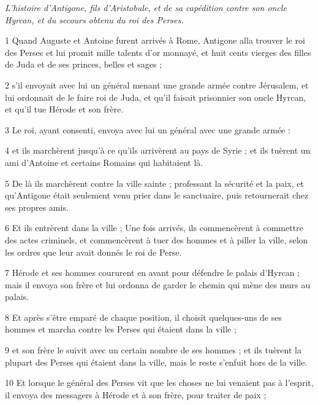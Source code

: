 
\par \textit{L'histoire d'Antigone, fils d'Aristobule, et de sa capédition contre son oncle Hyrcan, et du secours obtenu du roi des Perses.}

\par 1 Quand Auguste et Antoine furent arrivés à Rome, Antigone alla trouver le roi des Perses et lui promit mille talents d'or monnayé, et huit cents vierges des filles de Juda et de ses princes, belles et sages ;

\par 2 s'il envoyait avec lui un général menant une grande armée contre Jérusalem, et lui ordonnait de le faire roi de Juda, et qu'il faisait prisonnier son oncle Hyrcan, et qu'il tue Hérode et son frère.

\par 3 Le roi, ayant consenti, envoya avec lui un général avec une grande armée :

\par 4 et ils marchèrent jusqu'à ce qu'ils arrivèrent au pays de Syrie ; et ils tuèrent un ami d'Antoine et certains Romains qui habitaient là.

\par 5 De là ils marchèrent contre la ville sainte ; professant la sécurité et la paix, et qu'Antigone était seulement venu prier dans le sanctuaire, puis retournerait chez ses propres amis.

\par 6 Et ils entrèrent dans la ville ; Une fois arrivés, ils commencèrent à commettre des actes criminels, et commencèrent à tuer des hommes et à piller la ville, selon les ordres que leur avait donnés le roi de Perse.

\par 7 Hérode et ses hommes coururent en avant pour défendre le palais d'Hyrcan ; mais il envoya son frère et lui ordonna de garder le chemin qui mène des murs au palais.

\par 8 Et après s'être emparé de chaque position, il choisit quelques-uns de ses hommes et marcha contre les Perses qui étaient dans la ville ;

\par 9 et son frère le suivit avec un certain nombre de ses hommes ; et ils tuèrent la plupart des Perses qui étaient dans la ville, mais le reste s'enfuit hors de la ville.

\par 10 Et lorsque le général des Perses vit que les choses ne lui venaient pas à l'esprit, il envoya des messagers à Hérode et à son frère, pour traiter de paix ;

